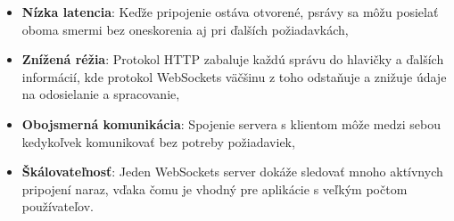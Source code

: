 \begin{itemize}

    \item \textbf{Nízka latencia}: Keďže pripojenie ostáva otvorené, psrávy sa môžu posielať oboma smermi bez oneskorenia aj pri ďalších požiadavkách,
    \item \textbf{Znížená réžia}: Protokol HTTP zabaluje každú správu do hlavičky a ďalších informácií, kde protokol WebSockets väčšinu z toho odstaňuje a znižuje údaje na odosielanie a spracovanie,
    \item \textbf{Obojsmerná komunikácia}: Spojenie servera s klientom môže medzi sebou kedykoľvek komunikovať bez potreby požiadaviek,
    \item \textbf{Škálovateľnosť}: Jeden WebSockets server dokáže sledovať mnoho aktívnych pripojení naraz, vďaka čomu je vhodný pre aplikácie s veľkým počtom používateľov. \cite{web}

\end{itemize}
